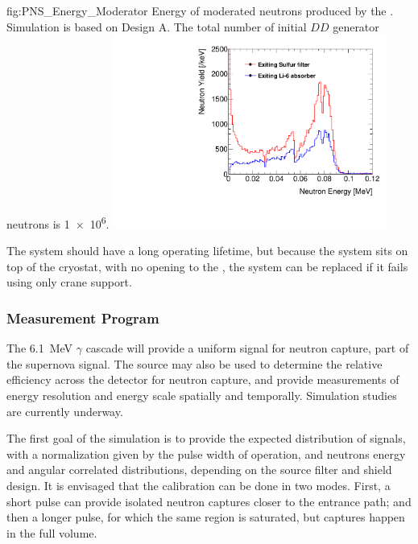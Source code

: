 \begin{dunefigure}{fig:PNS_Energy_Moderator}
{Energy of moderated neutrons produced by the . Simulation is based on Design A. The total number of initial $DD$ generator neutrons is \num{1e6}. }
\includegraphics[width=9cm]{graphics/PNS_Energy_Moderator.pdf}
\end{dunefigure}

The system should have a long operating lifetime, but because the  system sits on top of the cryostat, with no opening to the , the system can be replaced if it fails using only crane support.


\subsubsection{Measurement Program}
\label{sec:dp-calib-sys-pns-meas}

The \SI{6.1}{\MeV} $\gamma$ cascade will provide a uniform signal for neutron capture, part of the supernova signal. The source may also be used to determine the relative efficiency across the detector for neutron capture, and provide measurements of energy resolution and energy scale spatially and temporally. Simulation studies are currently underway.


The first goal of the simulation is to provide the expected distribution of signals, with a normalization given by the pulse width of  operation, and neutrons energy and angular correlated distributions, depending on the source filter and shield design.
It is envisaged that the calibration can be done in two modes. First, a short  pulse can provide isolated neutron captures closer to the entrance path; and then a longer 
pulse, for which the same region is saturated, but captures happen in the full volume.

